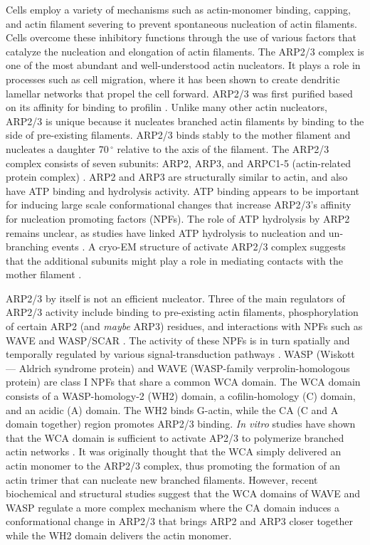 \documentclass{ucetd}
\begin{document}
Cells employ a variety of mechanisms such as actin-monomer binding, capping, and actin filament severing to prevent spontaneous nucleation of actin filaments.  Cells overcome these inhibitory functions through the use of various factors that catalyze the nucleation and elongation of actin filaments.  The ARP2/3 complex is one of the most abundant and well-understood actin nucleators.  It plays a role in processes such as cell migration, where it has been shown to create dendritic lamellar networks that propel the cell forward.  ARP2/3 was first purified based on its affinity for binding to profilin \cite{Machesky:1994wg}.  Unlike many other actin nucleators, ARP2/3 is unique because it nucleates branched actin filaments by binding to the side of pre-existing filaments.  ARP2/3 binds stably to the mother filament and nucleates a daughter 70$\,^{\circ}$ relative to the axis of the filament.  The ARP2/3 complex consists of seven subunits: ARP2, ARP3, and ARPC1-5 (actin-related protein complex) \cite{Goley:2006cr}.  ARP2 and ARP3 are structurally similar to actin, and also have ATP binding and hydrolysis activity.  ATP binding appears to be important for inducing large scale conformational changes that increase ARP2/3's affinity for nucleation promoting factors (NPFs).  The role of ATP hydrolysis by ARP2 remains unclear, as studies have linked ATP hydrolysis to nucleation and un-branching events \cite{Dayel:2004dy,LeClainche:2003bh}.  A cryo-EM structure of activate ARP2/3 complex suggests that the additional subunits might play a role in mediating contacts with the mother filament \cite{Egile:2005bm}.




ARP2/3 by itself is not an efficient nucleator.  Three of the main regulators of ARP2/3 activity include binding to pre-existing actin filaments, phosphorylation of certain ARP2 (and \textit{maybe} ARP3) residues, and interactions with NPFs such as WAVE and WASP/SCAR \cite{Campellone:2010gd}.  The activity of these NPFs is in turn spatially and temporally regulated by various signal-transduction pathways \cite{Goley:2006cr}.  WASP (Wiskott— Aldrich syndrome protein) and WAVE (WASP-family verprolin-homologous protein) are class I NPFs that share a common WCA domain.  The WCA domain consists of a WASP-homology-2 (WH2) domain, a cofilin-homology (C) domain, and an acidic (A) domain.  The WH2 binds G-actin, while the CA (C and A domain together) region promotes ARP2/3 binding.  \textit{In vitro} studies have shown that the WCA domain is sufficient to activate AP2/3 to polymerize branched actin networks \cite{Goley:2006cr}.  It was originally thought that the WCA simply delivered an actin monomer to the ARP2/3 complex, thus promoting the formation of an actin trimer that can nucleate new branched filaments.  However, recent biochemical and structural studies suggest that the WCA domains of WAVE and WASP regulate a more complex mechanism where the CA domain induces a conformational change in ARP2/3 that brings ARP2 and ARP3 closer together while the WH2 domain delivers the actin monomer.
\end{document}
